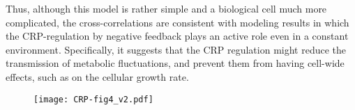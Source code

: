 Thus, although this model is rather simple and a biological cell much more complicated, %
the cross-correlations are consistent with modeling results 
in which the CRP-regulation by negative feedback plays an active role even in a constant environment.
%
Specifically, it suggests that the CRP regulation might 
reduce the transmission of metabolic fluctuations, 
and prevent them from having cell-wide effects, such as on the cellular growth rate.
%



%


\begin{figure}	
	\centering	
	\texttt{[image: CRP-fig4\_v2.pdf]}	
	\clearpage %
\end{figure}	

\clearpage

